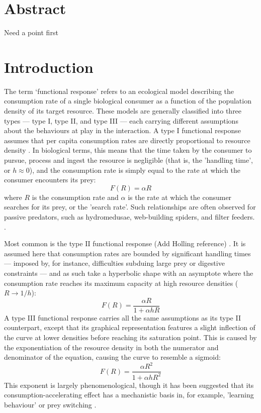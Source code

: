 \documentclass[11pt]{article}
\begin{document}
    
    
    
    
    \doublespacing
    \linenumbers 
    \section{Abstract}
    Need a point first
    
    \newpage
    
    
    \section{Introduction}
    The term ‘functional response’ refers to an ecological model describing the consumption rate of a single biological consumer as a function of the population density of its target resource. These models are generally classified into three types — type I, type II, and type III — each carrying different assumptions about the behaviours at play in the interaction. A type I functional response assumes that per capita consumption rates are directly proportional to resource density \parencite{holling1959a}. In biological terms, this means that the time taken by the consumer to pursue, process and ingest the resource is negligible (that is, the 'handling time', or $h\approx0$), and the consumption rate is simply equal to the rate at which the consumer encounters its prey:
    $$
        F(R) = \alpha R
    $$
    where $R$ is the consumption rate and $\alpha$ is the rate at which the consumer searches for its prey, or the 'search rate'. Such relationships are often observed for passive predators, such as hydromedusae, web-building spiders, and filter feeders. \parencite{jeschke2004consumer}.
    
    Most common is the  type II functional response (Add Holling reference) \parencite{hassell1976components} \parencite{begon1996ecology} \parencite{jeschke2004consumer}. It is assumed here that consumption rates are bounded by significant handling times — imposed by, for instance, difficulties subduing large prey \parencite{holling1959b} \parencite{jeschke2002predator} \parencite{okuyama2015egg} or digestive constraints \parencite{jeschke2002predator} \parencite{van2004digestively} — and as such take a hyperbolic shape with an asymptote where the consumption rate reaches its maximum capacity at high resource densities ($R\rightarrow1/h$):
    $$
        F(R) = \frac{\alpha R}{1+\alpha hR}
    $$
    A type III functional response carries all the same assumptions as its type II counterpart, except that its graphical representation features a slight inflection of the curve at lower densities before reaching its saturation point. This is caused by the exponentiation of the resource density in both the numerator and denominator of the equation, causing the curve to resemble a sigmoid:
    $$
        F(R) = \frac{\alpha R^2}{1+\alpha hR^2}
    $$
    This exponent is largely phenomenological, though it has been suggested that its consumption-accelerating effect has a mechanistic basis in, for example, 'learning behaviour' \parencite{real1977kinetics} \parencite{holling1965functional} or prey switching \parencite{murdoch1977stabilizing}.
    
\end{document}
